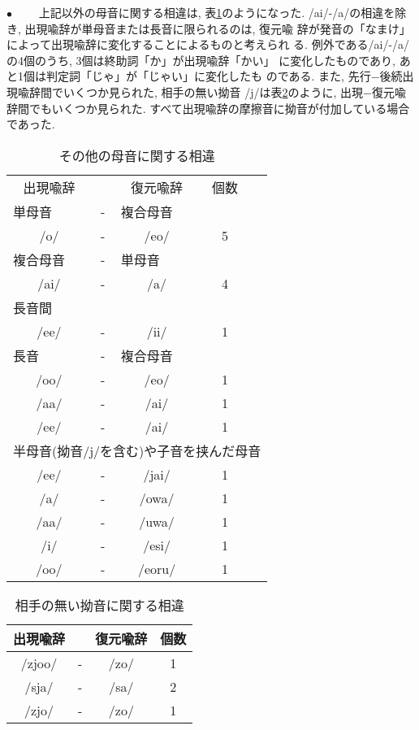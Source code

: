 \begin{list}{\Large $\bullet$}{}
\ \ \ \ 上記以外の母音に関する相違は, 表\ref{different8}のようになった. 
/ai/-/a/の相違を除き, 出現喩辞が単母音または長音に限られるのは, 復元喩
辞が発音の「なまけ」によって出現喩辞に変化することによるものと考えられ
る. 例外である/ai/-/a/の4個のうち, 3個は終助詞「か」が出現喩辞「かい」
に変化したものであり, あと1個は判定詞「じゃ」が「じゃい」に変化したも
のである. また, 先行−後続出現喩辞間でいくつか見られた, 相手の無い拗音
/j/は表\ref{different9}のように, 出現−復元喩辞間でもいくつか見られた. 
すべて出現喩辞の摩擦音に拗音が付加している場合であった.

\begin{table}
\begin{center}
\caption{その他の母音に関する相違}\label{different8}
\begin{tabular}{ccccc}
出現喩辞 && 復元喩辞 & 個数 &\\\cline{1-4}
\multicolumn{1}{l}{単母音} & - & \multicolumn{1}{l}{複合母音} &&\\
/o/ & - & /eo/ & 5 &\\
\multicolumn{1}{l}{複合母音} & - & \multicolumn{1}{l}{単母音} &&\\
/ai/ & - & /a/ & 4 &\\
\multicolumn{1}{l}{長音間} &&&&\\
/ee/ & - & /ii/ & 1 &\\
\multicolumn{1}{l}{長音} & - & \multicolumn{1}{l}{複合母音} &&\\
/oo/ & - & /eo/ & 1 &\\
/aa/ & - & /ai/ & 1 &\\
/ee/ & - & /ai/ & 1 &\\
\multicolumn{5}{l}{半母音(拗音/j/を含む)や子音を挟んだ母音}\\
/ee/ & - & /jai/ & 1 &\\
/a/ & - & /owa/ & 1 &\\
/aa/ & - & /uwa/ & 1 &\\
/i/ & - & /esi/ & 1 &\\
/oo/ & - & /eoru/ & 1 &\\
\end{tabular}
\end{center}
\end{table}

\begin{table}
\begin{center}
\caption{相手の無い拗音に関する相違}\label{different9}
\begin{tabular}{cccc}
出現喩辞 && 復元喩辞 & 個数\\\hline
/zjoo/ & - & /zo/ & 1\\
/sja/ & - & /sa/ & 2\\
/zjo/ & - & /zo/ & 1\\
\end{tabular}
\end{center}
\end{table}


\end{list}
